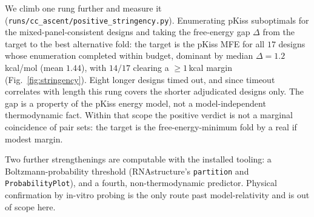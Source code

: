 \documentclass[11pt]{article}
\begin{document}
We climb one rung further and measure it (\texttt{runs/cc\_ascent/positive\_stringency.py}). Enumerating pKiss
suboptimals for the mixed-panel-consistent designs and taking the free-energy gap $\Delta$ from the target to
the best alternative fold: the target is the pKiss MFE for all $17$ designs whose enumeration completed within
budget, dominant by median $\Delta{=}1.2$\,kcal/mol (mean $1.44$), with $14/17$ clearing a $\ge1$\,kcal margin (Fig.~\ref{fig:stringency}).
Eight longer designs timed out, and since timeout correlates with length this rung covers the shorter
adjudicated designs only. The gap is a property of the pKiss energy model, not a model-independent
thermodynamic fact. Within that scope the positive verdict is not a marginal coincidence of pair sets: the
target is the free-energy-minimum fold by a real if modest margin.

Two further strengthenings are computable with the installed tooling: a
Boltzmann-probability threshold (RNAstructure's \texttt{partition} and \texttt{ProbabilityPlot}), and a
fourth, non-thermodynamic predictor. Physical confirmation by in-vitro probing is the
only route past model-relativity and is out of scope here.

\clearpage


\end{document}
